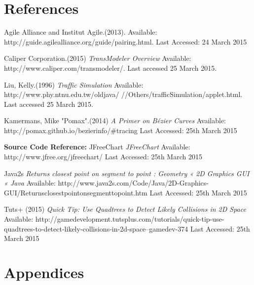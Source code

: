 \documentclass[11pt]{article}
\begin{document}
\section{References}
\begin{thebibliography}{5}

Agile Alliance and Institut Agile.(2013). Available: http://guide.agilealliance.org/guide/pairing.html. Last Accessed: 24 March 2015

Caliper Corporation.(2015) \emph{TransModeler Overview}
Available: http://www.caliper.com/transmodeler/. Last accessed 25 March 2015.

Liu, Kelly.(1996) \emph{Traffic Simulation} Available:
http://www.phy.ntnu.edu.tw/oldjava/
//Others/trafficSimulation/applet.html. 
Last accessed 25 March 2015.

 Kamermans, Mike "Pomax".(2014) \emph{A Primer on Bézier Curves} Available: http://pomax.github.io/bezierinfo/\#tracing Last Accessed: 25th March 2015

\textbf{Source Code Reference:}
 JFreeChart \emph{JFreeChart} Available: http://www.jfree.org/jfreechart/ Last Accessed: 25th March 2015

 Java2s \emph{Returns closest point on segment to point : Geometry « 2D Graphics GUI « Java} Available: http://www.java2s.com/Code/Java/2D-Graphics-GUI/Returnsclosestpointonsegmenttopoint.htm Last Accessed: 25th March 2015

 Tuts+ (2015) \emph{Quick Tip: Use Quadtrees to Detect Likely Collisions in 2D Space} Available: http://gamedevelopment.tutsplus.com/tutorials/quick-tip-use-quadtrees-to-detect-likely-collisions-in-2d-space--gamedev-374 Last Accessed: 25th March 2015


\end{thebibliography}
	
\section{Appendices} %
\end{document}
